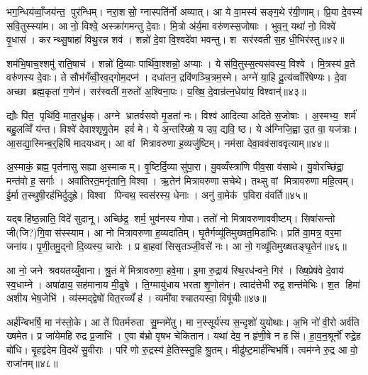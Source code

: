 भग॒न्धिय॑व्वाँ॒जय॑न्त॒ पुर॑न्धिम्। नरा॒शसो॒ ग्नास्पति॑र्नो अव्यात्। आ ये वा॒मस्य॑ सङ्ग॒थे र॑यी॒णाम्। प्रि॒या दे॒वस्य॑ सवि॒तुस्स्या॑म। आ नो॒ विश्वे॒ अस्क्रा॑गमन्तु दे॒वाः। मि॒त्रो अ॑र्य॒मा वरु॑णस्स॒जोषाः। भुव॒न्॒ यथा॑ नो॒ विश्वे॑ वृ॒धास॑। करन्थ्सु॒षाहा॑ विथु॒रन्न शव॑। शन्नो॑ दे॒वा वि॒श्वदे॑वा भवन्तु। श सर॑स्वती स॒ह धी॒भिर॑स्तु॥४२॥

शम॑भि॒षाच॒श्शमु॑ राति॒षाच॑। शन्नो॑ दि॒व्याः पार्थि॑वा॒श्शन्नो॒ अप्याः। ये स॑वि॒तुस्स॒त्यस॑वस्य॒ विश्वे। मि॒त्रस्य॑ व्र॒ते वरु॑णस्य दे॒वाः। ते सौभ॑गँव्वी॒रव॒द्गोम॒दप्न॑। दधा॑तन॒ द्रवि॑णञ्चि॒त्रम॒स्मे। अग्ने॑ या॒हि दू॒त्य॑व्वाँरि॑षेण्यः। दे॒वा अच्छा ब्रह्म॒कृता॑ ग॒णेन॑। सर॑स्वतीं म॒रुतो॑ अ॒श्विना॒पः। य॒ख्षि॒ दे॒वान्र॑त्न॒धेया॑य॒ विश्वान्॑॥४३॥

द्यौः पि॑त॒ पृथि॑वि॒ मात॒रध्रु॑क्। अग्ने भ्रातर्वसवो मृ॒डता॑ नः। विश्व॑ आदित्या अदिते स॒जोषाः। अ॒स्मभ्य॒ शर्म॑ बहु॒लव्विँ य॑न्त। विश्वे॑ देवाश्शृणु॒तेम हवं॑ मे। ये अ॒न्तरि॑ख्षे॒ य उप॒ द्यवि॒ ष्ठ। ये अ॑ग्निजि॒ह्वा उ॒त वा॒ यज॑त्राः। आ॒सद्या॒स्मिन्ब॒र्॒हिषि॑ मादयध्वम्। आ वां मित्रावरुणा ह॒व्यजु॑ष्टिम्। नम॑सा देवा॒वव॑साववृत्याम्॥४४॥

अ॒स्माकं॒ ब्रह्म॒ पृत॑नासु सह्या अ॒स्माकम्। वृ॒ष्टिर्दि॒व्या सु॑पा॒रा। यु॒वव्वँस्त्रा॑णि पीव॒सा व॑साथे। यु॒वोरच्छि॑द्रा॒ मन्त॑वो ह॒ सर्गाः। अवा॑तिरत॒मनृ॑तानि॒ विश्वा। ऋ॒तेन॑ मित्रावरुणा सचेथे। तथ्सु वां मित्रावरुणा महि॒त्वम्। ई॒र्मा त॒स्थुषी॒रह॑भिर्दुदुह्रे। विश्वा पिन्वथ॒ स्वस॑रस्य॒ धेनाः। अनु॑ वा॒मेक॑ प॒विरा व॑वर्ति॥४५॥

यद्बहि॑ष्ठ॒न्नाति॒ विदे॑ सुदानू। अच्छि॑द्र॒ शर्म॒ भुव॑नस्य गोपा। ततो॑ नो मित्रावरुणाववीष्टम्। सिषा॑सन्तो जी(जि?)गि॒वास॑स्स्याम। आ नो मित्रावरुणा ह॒व्यदा॑तिम्। घृ॒तैर्गव्यू॑तिमुख्षत॒मिडा॑भिः। प्रति॑ वा॒मत्र॒ वर॒मा जना॑य। पृ॒णी॒तमु॒द्नो दि॒व्यस्य॒ चारोः। प्र बा॒हवा॑ सिसृतञ्जी॒वसे॑ नः। आ नो॒ गव्यू॑तिमुख्षतङ्घृ॒तेन॑॥४६॥

आ नो॒ जने श्रवयतय्युँवाना। श्रु॒तं मे॑ मित्रावरुणा॒ हवे॒मा। इ॒मा रु॒द्राय॑ स्थि॒रध॑न्वने॒ गिर॑। ख्षि॒प्रेष॑वे दे॒वाय॑ स्व॒धाम्ने। अषा॑ढाय॒ सह॑मानाय मी॒ढुषे। ति॒ग्मायु॑धाय भरता शृ॒णोत॑न। त्वाद॑त्तेभी रुद्र॒ शन्त॑मेभिः। श॒त हिमा॑ अशीय भेष॒जेभि॑। व्य॑स्मद्द्वेषो॑ वित॒रव्व्यँह॑। व्यमी॑वाश्चातयस्वा॒ विषू॑चीः॥४७॥

अर्\mbox{}ह॑न्बिभर्\mbox{}षि॒ मा न॑स्तो॒के। आ ते॑ पितर्मरुता सु॒म्नमे॑तु। मा न॒स्सूर्य॑स्य स॒न्दृशो॑ युयोथाः। अ॒भि नो॑ वी॒रो अर्व॑ति ख्षमेत। प्र जा॑येमहि रुद्र प्र॒जाभि॑। ए॒वा ब॑भ्रो वृषभ चेकितान। यथा॑ देव॒ न हृ॑णी॒षे न हसि॑। हा॒व॒न॒श्रूर्नो॑ रुद्रे॒ह बो॑धि। बृ॒हद्व॑देम वि॒दथे॑ सु॒वीराः। परि॑ णो रु॒द्रस्य॑ हे॒तिस्स्तु॒हि श्रु॒तम्। मीढु॑ष्ट॒मार्\mbox{}ह॑न्बिभर्\mbox{}षि। त्वम॑ग्ने रु॒द्र आ वो॒ राजा॑नम्॥४८॥\anuvakamend[वसू॑नि ततानास्तु॒ विश्वान्॑ ववृत्याव्वँवर्ति घृ॒तेन॒ विषू॑चीश्श्रु॒तन्द्वे च॑]


